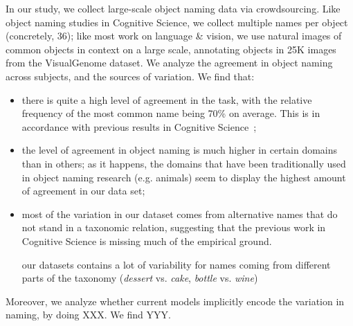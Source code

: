 In our study, we collect large-scale object naming data via crowdsourcing.
Like object naming studies in Cognitive Science, we collect multiple names per object (concretely, 36); like most work on language \& vision, we use natural images of common objects in context 
on a large scale, annotating objects in 25K images from the VisualGenome \cite{krishna2016visualgenome} dataset.
We analyze the agreement in object naming across subjects, and the sources of variation. We find that: 

\begin{itemize}
\item there is quite a high level of agreement in the task, with the relative frequency of the most common name being 70\% on average. This is in accordance with previous results in Cognitive Science~\cite{add-ref};
\item the level of agreement in object naming is much higher in certain domains than in others; as it happens, the domains that have been traditionally used in object naming research (e.g. animals) seem to display the highest amount of agreement in our data set;
\item most of the variation in our dataset comes from alternative names that do not stand in a taxonomic relation, suggesting that the previous work in Cognitive Science is missing much of the empirical ground.

our datasets contains a lot of variability for names coming from different parts of the taxonomy (\emph{dessert} vs. \emph{cake}, \emph{bottle} vs. \emph{wine})
\end{itemize}

Moreover, we analyze whether current models implicitly encode the variation in naming, by doing XXX. We find YYY.



